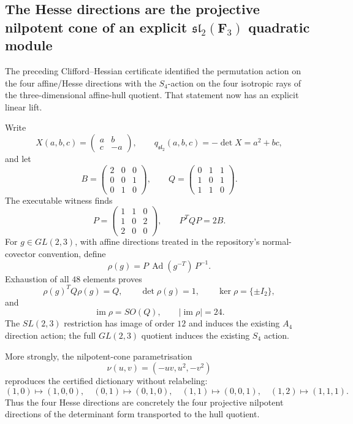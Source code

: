 \subsection*{The Hesse directions are the projective nilpotent cone of an explicit
\(\mathfrak{sl}_2(\mathbf F_3)\) quadratic module}

The preceding Clifford--Hessian certificate identified the permutation action
on the four affine/Hesse directions with the \(S_4\)-action on the four
isotropic rays of the three-dimensional affine-hull quotient. That statement
now has an explicit linear lift.

Write
\[
 X(a,b,c)=\begin{pmatrix}a&b\\c&-a\end{pmatrix},
 \qquad
 q_{\mathfrak{sl}_2}(a,b,c)=-\det X=a^2+bc,
\]
and let
\[
 B=\begin{pmatrix}2&0&0\\0&0&1\\0&1&0\end{pmatrix},\qquad
 Q=\begin{pmatrix}0&1&1\\1&0&1\\1&1&0\end{pmatrix}.
\]
The executable witness finds
\[
 P=\begin{pmatrix}1&1&0\\1&0&2\\2&0&0\end{pmatrix},
 \qquad
 \boxed{P^TQP=2B}.
\]
For \(g\in GL(2,3)\), with affine directions treated in the repository's
normal-covector convention, define
\[
 \boxed{\rho(g)=P\,\operatorname{Ad}(g^{-T})\,P^{-1}}.
\]
Exhaustion of all \(48\) elements proves
\[
 \rho(g)^TQ\rho(g)=Q,\qquad \det\rho(g)=1,\qquad
 \ker\rho=\{\pm I_2\},
\]
and
\[
 \boxed{\operatorname{im}\rho=SO(Q),\qquad |\operatorname{im}\rho|=24.}
\]
The \(SL(2,3)\) restriction has image of order \(12\) and induces the existing
\(A_4\) direction action; the full \(GL(2,3)\) quotient induces the existing
\(S_4\) action.

More strongly, the nilpotent-cone parametrisation
\[
 \nu(u,v)=(-uv,u^2,-v^2)
\]
reproduces the certified dictionary without relabeling:
\[
 (1,0)\mapsto(1,0,0),\quad
 (0,1)\mapsto(0,1,0),\quad
 (1,1)\mapsto(0,0,1),\quad
 (1,2)\mapsto(1,1,1).
\]
Thus the four Hesse directions are concretely the four projective nilpotent
directions of the determinant form transported to the hull quotient.

